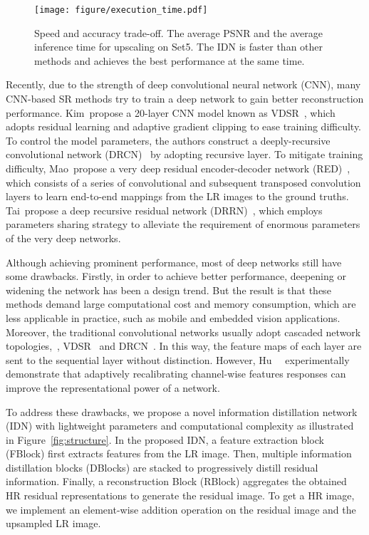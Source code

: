 \documentclass[10pt,twocolumn,letterpaper]{article}
\begin{document}
\begin{figure}[!t]
	\begin{center}
		\texttt{[image: figure/execution\_time.pdf]}
	\end{center}
	\caption{Speed and accuracy trade-off. The average PSNR and the average inference time for upscaling  on Set5. The IDN is faster than other methods and achieves the best performance at the same time.}
	\label{fig:execution_time}
\end{figure}

Recently, due to the strength of deep convolutional neural network (CNN), many CNN-based SR methods try to train a deep network to gain better reconstruction performance. Kim~\etal propose a 20-layer CNN model known as VDSR~\cite{VDSR}, which adopts residual learning and adaptive gradient clipping to ease training difficulty. To control the model parameters, the authors construct a deeply-recursive convolutional network (DRCN)~\cite{DRCN} by adopting recursive layer. To mitigate training difficulty, Mao~\etal propose a very deep residual encoder-decoder network (RED)~\cite{RED}, which consists of a series of convolutional and subsequent transposed convolution layers to learn end-to-end mappings from the LR images to the ground truths. Tai~\etal propose a deep recursive residual network (DRRN)~\cite{DRRN}, which employs parameters sharing strategy to alleviate the requirement of enormous parameters of the very deep networks.

Although achieving prominent performance, most of deep networks still have some drawbacks. Firstly, in order to achieve better performance, deepening or widening the network has been a design trend. But the result is that these methods demand large computational cost and memory consumption, which are less applicable in practice, such as mobile and embedded vision applications. Moreover, the traditional convolutional networks usually adopt cascaded network topologies,~\eg, VDSR~\cite{VDSR} and DRCN~\cite{DRCN}. In this way, the feature maps of each layer are sent to the sequential layer without distinction. However, Hu~\etal~\cite{SENet} experimentally demonstrate that adaptively recalibrating channel-wise features responses can improve the representational power of a network.

To address these drawbacks, we propose a novel information distillation network (IDN) with lightweight parameters and computational complexity as illustrated in Figure~\ref{fig:structure}. In the proposed IDN, a feature extraction block (FBlock) first extracts features from the LR image. Then, multiple information distillation blocks (DBlocks) are stacked to progressively distill residual information. Finally, a reconstruction Block (RBlock) aggregates the obtained HR residual representations to generate the residual image. To get a HR image, we implement an element-wise addition operation on the residual image and the upsampled LR image.
\end{document}
